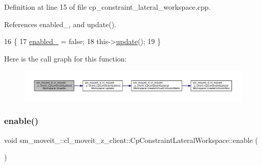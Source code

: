 Definition at line 15 of file cp\+\_\+constraint\+\_\+lateral\+\_\+workspace.\+cpp.



References enabled\+\_\+, and update().


\begin{DoxyCode}
16         \{
17             \hyperlink{classsm__moveit__4_1_1cl__moveit__z__client_1_1CpConstraintLateralWorkspace_a869220e440aadc79cf5213b6d27c1217}{enabled\_} = \textcolor{keyword}{false};
18             this->\hyperlink{classsm__moveit__4_1_1cl__moveit__z__client_1_1CpConstraintLateralWorkspace_a1b96546a90ecd3ce10a73b65ff5fcf35}{update}();
19         \}
\end{DoxyCode}
Here is the call graph for this function\+:
\nopagebreak
\begin{figure}[H]
\begin{center}
\leavevmode
\includegraphics[width=350pt]{classsm__moveit__4_1_1cl__moveit__z__client_1_1CpConstraintLateralWorkspace_a8d4567487c11e835447cc98d3046a9e2_cgraph}
\end{center}
\end{figure}
\mbox{\label{classsm__moveit__4_1_1cl__moveit__z__client_1_1CpConstraintLateralWorkspace_afa4487214f0213724159264de374267b}} 
\subsubsection{\texorpdfstring{enable()}{enable()}}
{\footnotesize\ttfamily void sm\+\_\+moveit\+\_\+::cl\+\_\+moveit\+\_\+z\+\_\+client\+::\+Cp\+Constraint\+Lateral\+Workspace\+::enable (\begin{DoxyParamCaption}{ }\end{DoxyParamCaption})}



